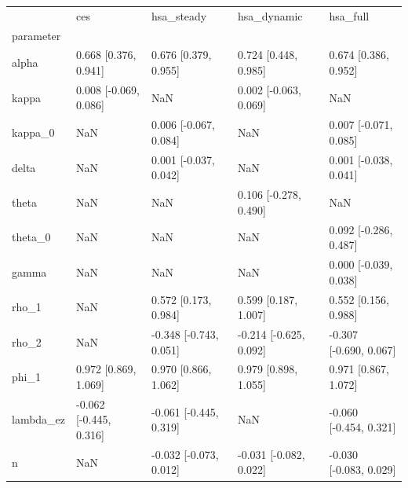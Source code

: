 \begin{tabular}{lllll}
\toprule
 & ces & hsa\_steady & hsa\_dynamic & hsa\_full \\
parameter &  &  &  &  \\
\midrule
alpha & 0.668 [0.376, 0.941] & 0.676 [0.379, 0.955] & 0.724 [0.448, 0.985] & 0.674 [0.386, 0.952] \\
kappa & 0.008 [-0.069, 0.086] & NaN & 0.002 [-0.063, 0.069] & NaN \\
kappa\_0 & NaN & 0.006 [-0.067, 0.084] & NaN & 0.007 [-0.071, 0.085] \\
delta & NaN & 0.001 [-0.037, 0.042] & NaN & 0.001 [-0.038, 0.041] \\
theta & NaN & NaN & 0.106 [-0.278, 0.490] & NaN \\
theta\_0 & NaN & NaN & NaN & 0.092 [-0.286, 0.487] \\
gamma & NaN & NaN & NaN & 0.000 [-0.039, 0.038] \\
rho\_1 & NaN & 0.572 [0.173, 0.984] & 0.599 [0.187, 1.007] & 0.552 [0.156, 0.988] \\
rho\_2 & NaN & -0.348 [-0.743, 0.051] & -0.214 [-0.625, 0.092] & -0.307 [-0.690, 0.067] \\
phi\_1 & 0.972 [0.869, 1.069] & 0.970 [0.866, 1.062] & 0.979 [0.898, 1.055] & 0.971 [0.867, 1.072] \\
lambda\_ez & -0.062 [-0.445, 0.316] & -0.061 [-0.445, 0.319] & NaN & -0.060 [-0.454, 0.321] \\
n & NaN & -0.032 [-0.073, 0.012] & -0.031 [-0.082, 0.022] & -0.030 [-0.083, 0.029] \\
\bottomrule
\end{tabular}

